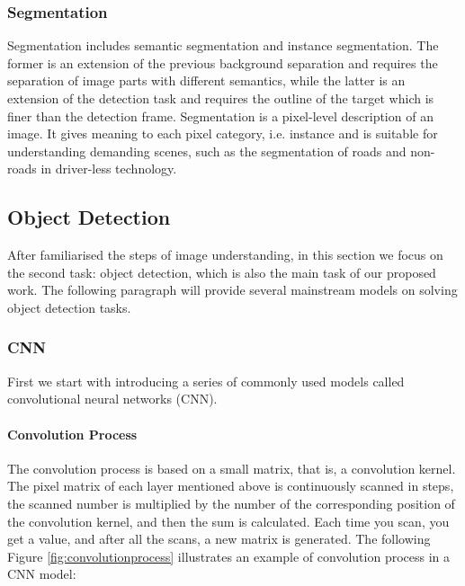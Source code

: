 \subsubsection{Segmentation}
Segmentation includes semantic segmentation and instance segmentation. The former is an extension of the previous background separation and requires the separation of image parts with different semantics, while the latter is an extension of the detection task and requires the outline of the target which is finer than the detection frame. Segmentation is a pixel-level description of an image. It gives meaning to each pixel category, i.e. instance and is suitable for understanding demanding scenes, such as the segmentation of roads and non-roads in driver-less technology.

\subsection{Object Detection}

After familiarised the steps of image understanding, in this section we focus on the second task: object detection, which is also the main task of our proposed work. The following paragraph will provide several mainstream models on solving object detection tasks.

\subsubsection{CNN}
First we start with introducing a series of commonly used models called convolutional neural networks (CNN). 

\paragraph{Convolution Process}
The convolution process is based on a small matrix, that is, a convolution kernel. The pixel matrix of each layer mentioned above is continuously scanned in steps, the scanned number is multiplied by the number of the corresponding position of the convolution kernel, and then the sum is calculated. Each time you scan, you get a value, and after all the scans, a new matrix is generated. The following Figure \ref{fig:convolutionprocess} illustrates an example of convolution process in a CNN model:

